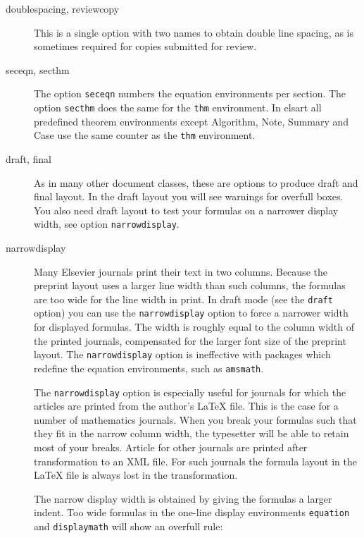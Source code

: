 \documentclass{elsart}
\begin{document}
\begin{description}
  
\item[doublespacing, reviewcopy] This is a single option with two
  names to obtain double line spacing, as is sometimes required for
  copies submitted for review.
  
\item[seceqn, secthm] The option \texttt{seceqn} numbers the equation
  environments per section. The option \texttt{secthm} does the same
  for the \texttt{thm} environment. In elsart all predefined theorem
  environments except Algorithm, Note, Summary and Case use the same
  counter as the \texttt{thm} environment.

\item[draft, final] As in many other document classes, these are
  options to produce draft and final layout. In the draft layout you
  will see warnings for overfull boxes. You also need draft layout to
  test your formulas on a narrower display width, see option
  \texttt{narrowdisplay}.
  
\item[narrowdisplay] Many Elsevier journals print their text in two
  columns. Because the preprint layout uses a larger line width
  than such columns, the formulas are too wide for the line width in
  print. In draft mode (see the \texttt{draft} option) you can use the
  \texttt{narrowdisplay} option to force a narrower width for
  displayed formulas. The width is roughly equal to the column width
  of the printed journals, compensated for the larger font size of the
  preprint layout. The \texttt{narrowdisplay} option is ineffective
  with packages which redefine the equation environments, such as
  \texttt{amsmath}.
  
  The \texttt{narrowdisplay} option is especially useful for journals
  for which the articles are printed from the author's \LaTeX{} file.
  This is the case for a number of mathematics journals. When you
  break your formulas such that they fit in the narrow column width,
  the typesetter will be able to retain most of your breaks. Article
  for other journals are printed after transformation to an XML file.
  For such journals the formula layout in the \LaTeX{} file is always
  lost in the transformation.
  
  The narrow display width is obtained by giving the formulas a larger
  indent. Too wide formulas in the one-line display environments
  \texttt{equation} and \texttt{displaymath} will show an overfull
  rule:
  

\end{description}
\end{document}
